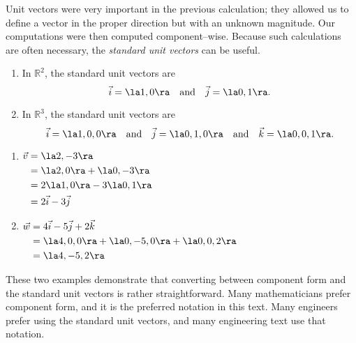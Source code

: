 Unit vectors were very important in the previous calculation; they allowed us to define a vector in the proper direction but with an unknown magnitude. Our computations were then computed component--wise. Because such calculations are often necessary, the \textit{standard unit vectors} can be useful.

{\begin{enumerate}
	\item In $\mathbb{R}^2$, the standard unit vectors are
	$$\vec i = \la 1,0\ra \quad \text{and}\quad \vec j = \la 0,1\ra.$$
	\item In $\mathbb{R}^3$, the standard unit vectors are
	$$\vec i = \la 1,0,0\ra \quad \text{and}\quad \vec j = \la 0,1,0\ra \quad \text{and}\quad \vec k = \la 0,0,1\ra.$$
\end{enumerate}
}

{\begin{enumerate}
	\item  \hfill$\displaystyle \begin{aligned}[t]
					\vec v &= \la 2,-3\ra \\
								&= \la 2,0\ra + \la 0,-3\ra \\
								&= 2\la 1,0\ra -3\la 0,1\ra\\
								&= 2\vec i - 3\vec j
				\end{aligned}$\hfill\null
	
	\item	\hfill $\displaystyle \begin{aligned}[t]
				\vec w &= 4\vec i - 5\vec j +2\vec k\\
							&= \la 4,0,0\ra +\la 0,-5,0\ra + \la 0,0,2\ra \\
							&= \la 4,-5,2\ra
							\end{aligned}$\hfill\null
\end{enumerate}
These two examples demonstrate that converting between component form and the standard unit vectors is rather straightforward. Many mathematicians prefer component form, and it is the preferred notation in this text. Many engineers prefer using the standard unit vectors, and many engineering text use that notation.}

